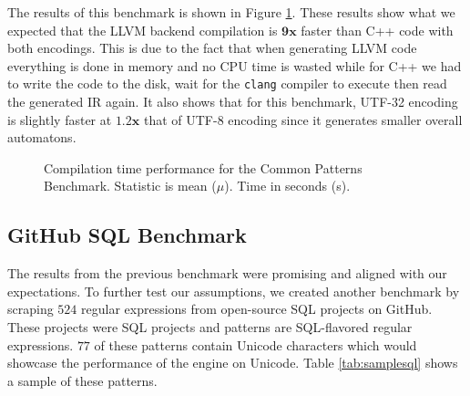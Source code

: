 The results of this benchmark is shown in Figure \ref{fig:eval_common}. These results show what we expected that the LLVM backend compilation is $\mathbf{9x}$ faster than C++ code with both encodings. This is due to the fact that when generating LLVM code everything is done in memory and no CPU time is wasted while for C++ we had to write the code to the disk, wait for the \texttt{clang} compiler to execute then read the generated IR again. It also shows that for this benchmark, UTF-32 encoding is slightly faster at $\mathbf{1.2x}$ that of UTF-8 encoding since it generates smaller overall automatons.

\begin{figure}[H]
\hspace*{-45pt}

\centering
{}

\caption{Compilation time performance for the Common Patterns Benchmark. Statistic is mean ($\mu$). Time in seconds (s).}
\label{fig:eval_common}
\end{figure}



\subsection{GitHub SQL Benchmark}
The results from the previous benchmark were promising and aligned with our expectations. To further test our assumptions, we created another benchmark by scraping $524$ regular expressions from open-source SQL projects on GitHub. These projects were SQL projects and patterns are SQL-flavored regular expressions. $77$ of these patterns contain Unicode characters which would showcase the performance of the engine on Unicode. Table \ref{tab:samplesql} shows a sample of these patterns.

